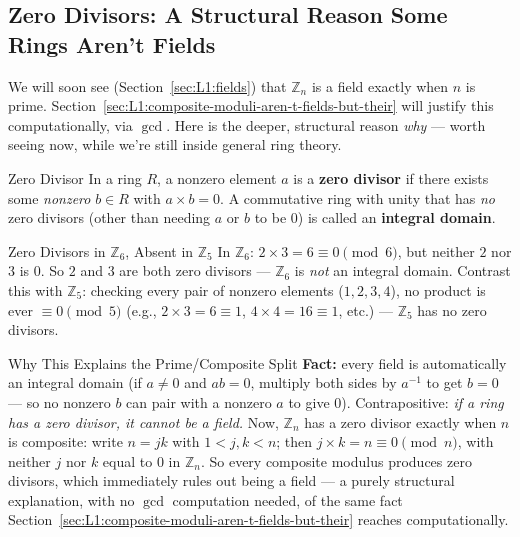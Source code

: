 \subsection{Zero Divisors: A Structural Reason Some Rings Aren't Fields}
\label{sec:L1:zero-divisors-a-structural-reason-some-r}

We will soon see (Section~\ref{sec:L1:fields}) that $\mathbb{Z}_n$ is a field exactly when $n$ is prime. Section~\ref{sec:L1:composite-moduli-aren-t-fields-but-their} will justify this computationally, via $\gcd$. Here is the deeper, structural reason \emph{why} --- worth seeing now, while we're still inside general ring theory.

\begin{defbox}{Zero Divisor}
In a ring $R$, a nonzero element $a$ is a \textbf{zero divisor} if there exists some \emph{nonzero} $b \in R$ with $a \times b = 0$. A commutative ring with unity that has \emph{no} zero divisors (other than needing $a$ or $b$ to be $0$) is called an \textbf{integral domain}.
\end{defbox}

\begin{exbox}{Zero Divisors in $\mathbb{Z}_6$, Absent in $\mathbb{Z}_5$}
In $\mathbb{Z}_6$: $2 \times 3 = 6 \equiv 0 \pmod 6$, but neither $2$ nor $3$ is $0$. So $2$ and $3$ are both zero divisors --- $\mathbb{Z}_6$ is \emph{not} an integral domain. Contrast this with $\mathbb{Z}_5$: checking every pair of nonzero elements ($1,2,3,4$), no product is ever $\equiv 0 \pmod 5$ (e.g., $2\times 3=6\equiv 1$, $4\times 4 = 16 \equiv 1$, etc.) --- $\mathbb{Z}_5$ has no zero divisors.
\end{exbox}

\begin{rmkbox}{Why This Explains the Prime/Composite Split}
\textbf{Fact:} every field is automatically an integral domain (if $a \ne 0$ and $ab=0$, multiply both sides by $a^{-1}$ to get $b=0$ --- so no nonzero $b$ can pair with a nonzero $a$ to give $0$). Contrapositive: \emph{if a ring has a zero divisor, it cannot be a field.} Now, $\mathbb{Z}_n$ has a zero divisor exactly when $n$ is composite: write $n = jk$ with $1 < j,k < n$; then $j \times k = n \equiv 0 \pmod n$, with neither $j$ nor $k$ equal to $0$ in $\mathbb{Z}_n$. So every composite modulus produces zero divisors, which immediately rules out being a field --- a purely structural explanation, with no $\gcd$ computation needed, of the same fact Section~\ref{sec:L1:composite-moduli-aren-t-fields-but-their} reaches computationally.
\end{rmkbox}


